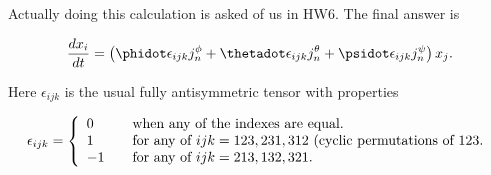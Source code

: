 Actually doing this calculation is asked of us in HW6.  The final answer is

\begin{equation}\label{eqn:classicalMechanicsEulerAngles:440}
\frac{d x_i}{dt} = \left(
\phidot \epsilon_{ijk} j_n^\phi
+\thetadot \epsilon_{ijk} j_n^\theta
+\psidot \epsilon_{ijk} j_n^\psi
\right) x_j.
\end{equation}

Here $\epsilon_{ijk}$ is the usual fully antisymmetric tensor with properties

\begin{equation}\label{eqn:classicalMechanicsEulerAngles:460}
\epsilon_{ijk} =
\left\{
\begin{array}{l l}
0 & \quad \mbox{when any of the indexes are equal.} \\
1 & \quad \mbox{for any of $ijk = 123, 231, 312$ (cyclic permutations of $123$.} \\
-1 & \quad \mbox{for any of $ijk = 213, 132, 321$.} \\
\end{array}
\right.
\end{equation}

\EndNoBibArticle
